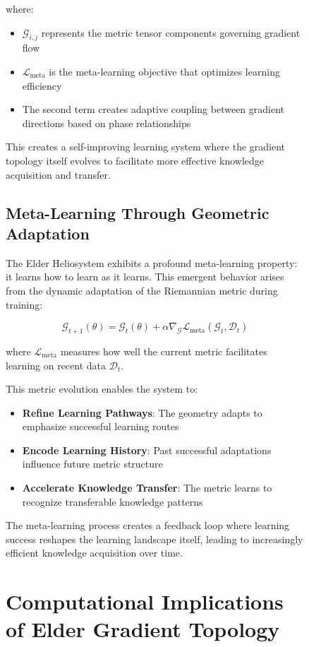 \begin{figure}[ht]
where:
\begin{itemize}
    \item $\mathcal{G}_{i,j}$ represents the metric tensor components governing gradient flow
    \item $\mathcal{L}_{\text{meta}}$ is the meta-learning objective that optimizes learning efficiency
    \item The second term creates adaptive coupling between gradient directions based on phase relationships
\end{itemize}

This creates a self-improving learning system where the gradient topology itself evolves to facilitate more effective knowledge acquisition and transfer.

\subsection{Meta-Learning Through Geometric Adaptation}

The Elder Heliosystem exhibits a profound meta-learning property: it learns how to learn as it learns. This emergent behavior arises from the dynamic adaptation of the Riemannian metric during training:

\begin{equation}
\mathcal{G}_{t+1}(\theta) = \mathcal{G}_t(\theta) + \alpha \nabla_{\mathcal{G}} \mathcal{L}_{\text{meta}}(\mathcal{G}_t, \mathcal{D}_t)
\end{equation}

where $\mathcal{L}_{\text{meta}}$ measures how well the current metric facilitates learning on recent data $\mathcal{D}_t$.

This metric evolution enables the system to:
\begin{itemize}
    \item \textbf{Refine Learning Pathways}: The geometry adapts to emphasize successful learning routes
    \item \textbf{Encode Learning History}: Past successful adaptations influence future metric structure
    \item \textbf{Accelerate Knowledge Transfer}: The metric learns to recognize transferable knowledge patterns
\end{itemize}

The meta-learning process creates a feedback loop where learning success reshapes the learning landscape itself, leading to increasingly efficient knowledge acquisition over time.

\section{Computational Implications of Elder Gradient Topology}


\end{figure}
